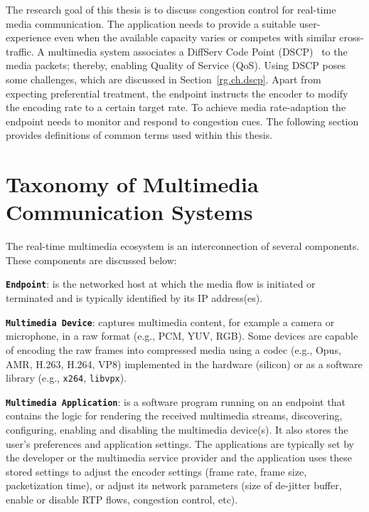 
The research goal of this thesis is to discuss congestion control for
real-time media communication. The application needs to provide a suitable
user-experience even when the available capacity varies or competes with
similar cross-traffic. A multimedia system associates a DiffServ Code Point
(DSCP)~\cite{rfc2474} to the media packets; thereby, enabling Quality of
Service (QoS). Using DSCP poses some challenges, which are discussed in
Section~\ref{rg.ch.dscp}. Apart from expecting preferential treatment, the
endpoint instructs the encoder to modify the encoding rate to a certain target
rate. To achieve media rate-adaption the endpoint needs to monitor and respond
to congestion cues. The following section provides definitions of common terms
used within this thesis.



\section{Taxonomy of Multimedia Communication Systems}

The real-time multimedia ecosystem is an interconnection of several
components. These components are discussed below:

\textbf{\texttt{Endpoint}}: is the networked host at which the media flow is
initiated or terminated and is typically identified by its IP address(es).


\textbf{\texttt{Multimedia Device}}: captures multimedia content, for example
a camera or microphone, in a raw format (e.g., PCM, YUV, RGB). Some devices
are capable of encoding the raw frames into compressed media using a codec
(e.g., Opus, AMR, H.263, H.264, VP8) implemented in the hardware (silicon) or
as a software library (e.g., \texttt{x264}, \texttt{libvpx}).


\textbf{\texttt{Multimedia Application}}: is a software program running on an
endpoint that contains the logic for rendering the received multimedia
streams, discovering, configuring, enabling and disabling the multimedia
device(s). It also stores the user's preferences and application settings. The
applications are typically set by the developer or the multimedia service
provider and the application uses these stored settings to adjust the encoder
settings (frame rate, frame size, packetization time), or adjust its network
parameters (size of de-jitter buffer, enable or disable RTP flows, congestion
control, etc).

